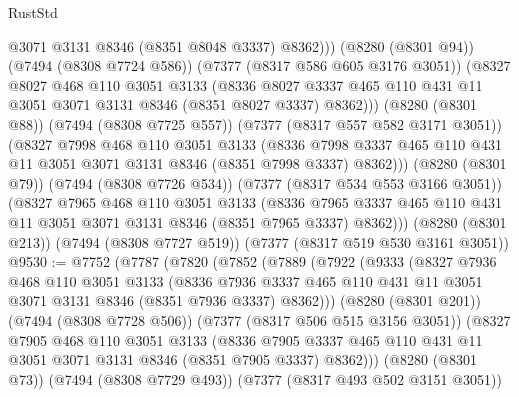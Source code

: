 \begin{lexlean}{RustStd}
\begin{coremodule}
                @3071
                @3131
                @8346
                (@8351 @8048 @3337)
                @8362)))
          (@8280 (@8301 @94))
          (@7494 (@8308 @7724 @586))
          (@7377 (@8317 @586 @605 @3176 @3051))
          (@8327
            @8027
            @468
            @110
            @3051
            @3133
            (@8336
              @8027
              @3337
              @465
              @110
              @431
              @11
              @3051
              @3071
              @3131
              @8346
              (@8351 @8027 @3337)
              @8362)))
        (@8280 (@8301 @88))
        (@7494 (@8308 @7725 @557))
        (@7377 (@8317 @557 @582 @3171 @3051))
        (@8327
          @7998
          @468
          @110
          @3051
          @3133
          (@8336 @7998 @3337 @465 @110 @431 @11 @3051 @3071 @3131 @8346 (@8351 @7998 @3337) @8362)))
      (@8280 (@8301 @79))
      (@7494 (@8308 @7726 @534))
      (@7377 (@8317 @534 @553 @3166 @3051))
      (@8327
        @7965
        @468
        @110
        @3051
        @3133
        (@8336 @7965 @3337 @465 @110 @431 @11 @3051 @3071 @3131 @8346 (@8351 @7965 @3337) @8362)))
    (@8280 (@8301 @213))
    (@7494 (@8308 @7727 @519))
    (@7377 (@8317 @519 @530 @3161 @3051))
@9530 := @7752
    (@7787
      (@7820
        (@7852
          (@7889
            (@7922
              (@9333
                (@8327
                  @7936
                  @468
                  @110
                  @3051
                  @3133
                  (@8336
                    @7936
                    @3337
                    @465
                    @110
                    @431
                    @11
                    @3051
                    @3071
                    @3131
                    @8346
                    (@8351 @7936 @3337)
                    @8362)))
              (@8280 (@8301 @201))
              (@7494 (@8308 @7728 @506))
              (@7377 (@8317 @506 @515 @3156 @3051))
              (@8327
                @7905
                @468
                @110
                @3051
                @3133
                (@8336
                  @7905
                  @3337
                  @465
                  @110
                  @431
                  @11
                  @3051
                  @3071
                  @3131
                  @8346
                  (@8351 @7905 @3337)
                  @8362)))
            (@8280 (@8301 @73))
            (@7494 (@8308 @7729 @493))
            (@7377 (@8317 @493 @502 @3151 @3051))

\end{coremodule}
\end{lexlean}
